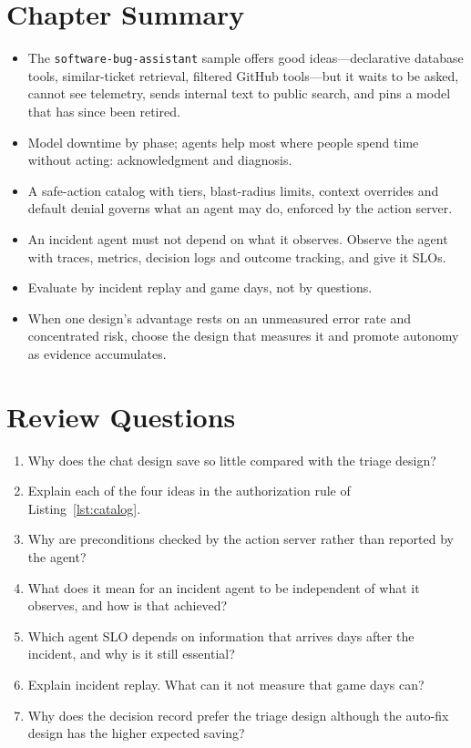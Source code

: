 \section*{Chapter Summary}

\begin{itemize}[itemsep=2pt]
  \item The \texttt{software-bug-assistant} sample offers good ideas---declarative database tools, similar-ticket retrieval, filtered GitHub tools---but it waits to be asked, cannot see telemetry, sends internal text to public search, and pins a model that has since been retired.
  \item Model downtime by phase; agents help most where people spend time without acting: acknowledgment and diagnosis.
  \item A safe-action catalog with tiers, blast-radius limits, context overrides and default denial governs what an agent may do, enforced by the action server.
  \item An incident agent must not depend on what it observes. Observe the agent with traces, metrics, decision logs and outcome tracking, and give it SLOs.
  \item Evaluate by incident replay and game days, not by questions.
  \item When one design's advantage rests on an unmeasured error rate and concentrated risk, choose the design that measures it and promote autonomy as evidence accumulates.
\end{itemize}

\section*{Review Questions}

\begin{enumerate}[itemsep=2pt]
  \item Why does the chat design save so little compared with the triage design?
  \item Explain each of the four ideas in the authorization rule of Listing~\ref{lst:catalog}.
  \item Why are preconditions checked by the action server rather than reported by the agent?
  \item What does it mean for an incident agent to be independent of what it observes, and how is that achieved?
  \item Which agent SLO depends on information that arrives days after the incident, and why is it still essential?
  \item Explain incident replay. What can it not measure that game days can?
  \item Why does the decision record prefer the triage design although the auto-fix design has the higher expected saving?
\end{enumerate}

